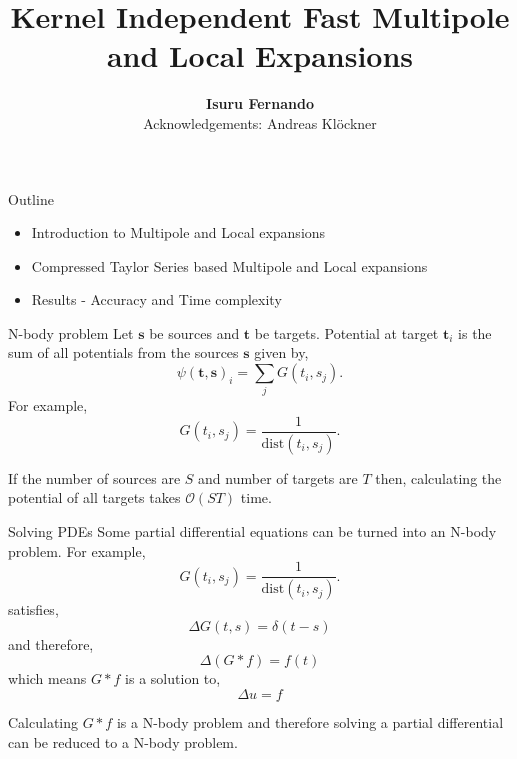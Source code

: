 \documentclass[10pt]{beamer}
\title{Kernel Independent Fast Multipole and Local Expansions}
\author{\textbf{Isuru Fernando} \\ Acknowledgements: Andreas Kl{\"o}ckner}
\def\b#1{\mathbf{ #1}}
\begin{document}
\maketitle

\begin{frame}[fragile]{Outline}
 \begin{itemize}
  \item Introduction to Multipole and Local expansions
  \item Compressed Taylor Series based Multipole and Local expansions
  \item Results - Accuracy and Time complexity
 \end{itemize}

\end{frame}

\begin{frame}[fragile]{N-body problem}
Let $\b s$ be sources and $\b t$ be targets. Potential at target $\b t_i$ is the sum of all potentials from the sources $\b s$ given by,
\[\psi(\b t, \b s)_i =  \sum_{j} G(t_i, s_j).\]
For example, \[G(t_i, s_j) = \frac{1}{\text{dist}(t_i, s_j)}.\]
\begin{center}
\end{center}
If the number of sources are $S$ and number of targets are $T$ then,
calculating the potential of all targets takes $\mathcal{O}(S T)$ time.

\end{frame}

\begin{frame}[fragile]{Solving PDEs}
 Some partial differential equations can be turned into an N-body problem.
 For example, \[G(t_i, s_j) = \frac{1}{\text{dist}(t_i, s_j)}.\]
 satisfies,
 \[
  \Delta G(t, s) = \delta(t - s)
 \]
 and therefore,
 \[
  \Delta (G * f) = f(t)
 \]
 which means $G * f$ is a solution to,
 \[
  \Delta u = f
 \]

 Calculating $G * f$ is a N-body problem and therefore solving a partial differential can be reduced to a N-body problem.


\end{frame}
\end{document}
